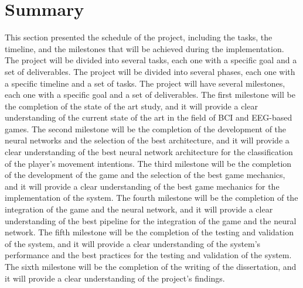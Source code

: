 \section{Summary}
This section presented the schedule of the project, including the tasks, the timeline, and the milestones that will be achieved during the implementation.
The project will be divided into several tasks, each one with a specific goal and a set of deliverables.
The project will be divided into several phases, each one with a specific timeline and a set of tasks.
The project will have several milestones, each one with a specific goal and a set of deliverables.
The first milestone will be the completion of the state of the art study, and it will provide a clear understanding of the current state of the art in the field of BCI and EEG-based games.
The second milestone will be the completion of the development of the neural networks and the selection of the best architecture, and it will provide a clear understanding of the best neural network architecture for the classification of the player's movement intentions.
The third milestone will be the completion of the development of the game and the selection of the best game mechanics, and it will provide a clear understanding of the best game mechanics for the implementation of the system.
The fourth milestone will be the completion of the integration of the game and the neural network, and it will provide a clear understanding of the best pipeline for the integration of the game and the neural network.
The fifth milestone will be the completion of the testing and validation of the system, and it will provide a clear understanding of the system's performance and the best practices for the testing and validation of the system.
The sixth milestone will be the completion of the writing of the dissertation, and it will provide a clear understanding of the project's findings.

